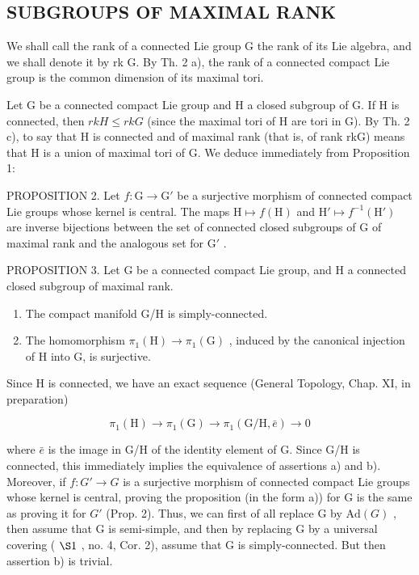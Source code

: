 \subsection{SUBGROUPS OF MAXIMAL RANK}

We shall call the rank of a connected Lie group G the rank of its Lie algebra, and we shall denote it by rk G. By Th. 2 a), the rank of a connected compact Lie group is the common dimension of its maximal tori.

Let G be a connected compact Lie group and H a closed subgroup of G. If H is connected, then \(rkH \leq rkG\) (since the maximal tori of H are tori in G). By Th. 2 c), to say that H is connected and of maximal rank (that is, of rank rkG) means that H is a union of maximal tori of G. We deduce immediately from Proposition 1:

PROPOSITION 2. Let \(f: \mathrm{G} \to \mathrm{G}'\) be a surjective morphism of connected compact Lie groups whose kernel is central. The maps \(\mathrm{H} \mapsto f(\mathrm{H})\) and \(\mathrm{H}' \mapsto f^{-1}(\mathrm{H}')\) are inverse bijections between the set of connected closed subgroups of \(\mathrm{G}\) of maximal rank and the analogous set for \(\mathrm{G}'\) .

PROPOSITION 3. Let G be a connected compact Lie group, and H a connected closed subgroup of maximal rank.

\begin{enumerate}
\def\labelenumi{\alph{enumi})}
\item
  The compact manifold G/H is simply-connected.
\item
  The homomorphism \(\pi_1(\mathrm{H})\to \pi_1(\mathrm{G})\) , induced by the canonical injection of H into G, is surjective.
\end{enumerate}

Since H is connected, we have an exact sequence (General Topology, Chap. XI, in preparation)

\[
\pi_ {1} (\mathrm{H}) \rightarrow \pi_ {1} (\mathrm{G}) \rightarrow \pi_ {1} (\mathrm{G/H}, \bar {e}) \rightarrow 0
\]

where \(\bar{e}\) is the image in G/H of the identity element of G. Since G/H is connected, this immediately implies the equivalence of assertions a) and b). Moreover, if \(f : G' \to G\) is a surjective morphism of connected compact Lie groups whose kernel is central, proving the proposition (in the form a)) for G is the same as proving it for \(G'\) (Prop. 2). Thus, we can first of all replace G by \(\text{Ad}(G)\) , then assume that G is semi-simple, and then by replacing G by a universal covering ( \(\S1\) , no. 4, Cor. 2), assume that G is simply-connected. But then assertion b) is trivial.

